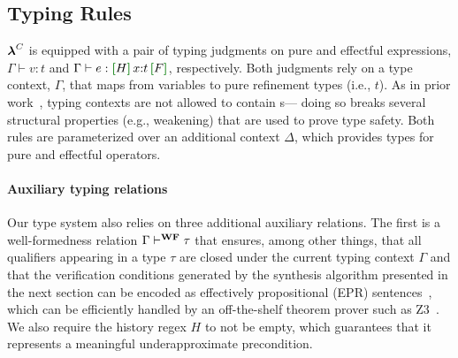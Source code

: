 \subsection{Typing Rules}

$\boldsymbol{\lambda}^{C}{}$ is equipped with a pair of typing judgments on pure and
effectful expressions, $\Gamma \vdash v : t$ and $\Gamma\vdash e:
\uhat{H}{x{:}t}{F}$, respectively. Both judgments rely on a type
context, $\Gamma$, that maps from variables to pure refinement types
(i.e., $t$). As in prior work~\cite{CoverageType}, typing contexts are not
allowed to contain \tyName{}s--- doing so breaks several structural
properties (e.g., weakening) that are used to prove type safety. Both
rules are parameterized over an additional context $\Delta$, which
provides types for pure and effectful operators.

\paragraph{Auxiliary typing relations}
Our type system also relies on three additional auxiliary
relations. The first is a well-formedness relation $\Gamma
\vdash^{\textbf{WF}} \tau$ that ensures, among other things, that all
qualifiers appearing in a type $\tau$ are closed under the current
typing context $\Gamma$ and that the verification conditions generated by
the synthesis algorithm presented in the next section can be encoded
as effectively propositional (EPR) sentences~\cite{Ramsey1987}, which
can be efficiently handled by an off-the-shelf theorem prover such as
Z3~\cite{de2008z3}.  We also require the
history regex $H$ to not be empty, which guarantees that it represents
a meaningful underapproximate precondition.

